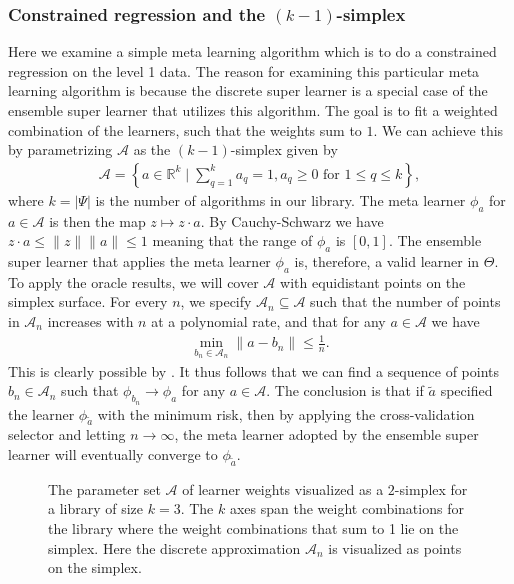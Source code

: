 \documentclass[11pt, a4paper]{article}
\theoremstyle{definition}
\theoremstyle{remark}
\newcommand\norm[1]{\lVert#1\rVert}
\newcommand{\q}{q}
\newcommand{\ml}{k}
\newcommand{\lib}{\Psi}
\newcommand{\meta}{\phi}
\begin{document}
\subsubsection{Constrained regression and the $ (\ml-1) $-simplex} 
Here we examine a simple meta learning algorithm which is to do a constrained regression on the level 1 data. The reason for examining this particular meta learning algorithm is because the discrete super learner is a special case of the ensemble super learner that utilizes this algorithm. The goal is to fit a weighted combination of the learners, such that the weights sum to $ 1 $. We can achieve this by parametrizing $ \mathcal{A} $ as the $ (\ml -1) $-simplex given by
\begin{align*}
    \mathcal{A} = \left\{ a \in \mathbb{R}^{\ml} \mid \sum_{\q = 1}^{\ml} a_\q = 1 , a_\q \geq 0 \text{ for } 1 \leq \q \leq k \right\}, 
\end{align*}
where $ k = | \lib | $ is the number of algorithms in our library. The meta learner $ \meta_{a} $ for $ a \in \mathcal{A} $ is then the map $ z \mapsto z \cdot a $. By Cauchy-Schwarz we have $ z \cdot a \leq \norm{z} \norm{a} \leq 1 $ meaning that the range of $ \meta_a $ is $ [0,1] $. The ensemble super learner that applies the meta learner $ \meta_a $ is, therefore, a valid learner in $ \Theta $. To apply the oracle results, we will cover $ \mathcal{A} $ with equidistant points on the simplex surface. For every $ n $, we specify $ \mathcal{A}_n \subseteq \mathcal{A} $ such that the number of points in $ \mathcal{A}_n $ increases with $ n $ at a polynomial rate, and that for any $ a \in \mathcal{A} $ we have 
\begin{align*}
    \min_{b_n \in \mathcal{A}_n } \norm{a - b_n} \leq \frac{1}{n}.
\end{align*}
This is clearly possible by . It thus follows that we can find a sequence of points $ b_n \in \mathcal{A}_n $ such that $ \meta_{b_n} \to \meta_{a} $ for any $ a \in \mathcal{A}$. The conclusion is that if $ \tilde{a} $ specified the learner $ \meta_{ \tilde{a} } $ with the minimum risk, then by applying the cross-validation selector and letting $ n \to \infty $, the meta learner adopted by the ensemble super learner will eventually converge to $ \meta_{ \tilde{a} } $. 

\begin{figure}[H]
    \centering
    
    \caption{The parameter set $ \mathcal{A} $ of learner weights visualized as a $ 2 $-simplex for a library of size $ \ml = 3 $. The $ k $ axes span the weight combinations for the library where the weight combinations that sum to 1 lie on the simplex. Here the discrete approximation $ \mathcal{A}_n $ is visualized as points on the simplex.}
    \label{fig:simplex}
\end{figure}
\end{document}
